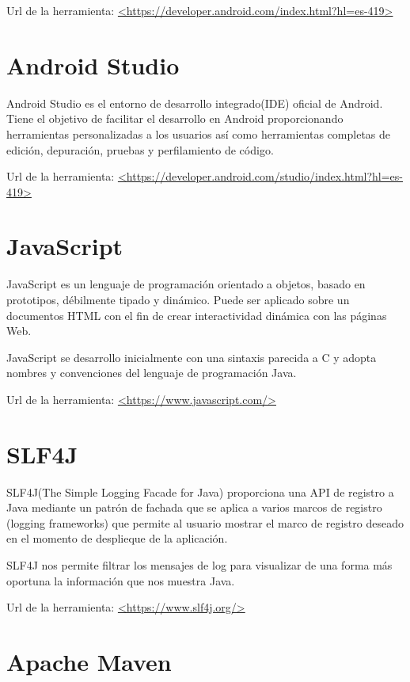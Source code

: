 Url de la herramienta: \url{<https://developer.android.com/index.html?hl=es-419>}

\section{Android Studio}

Android Studio es el entorno de desarrollo integrado(IDE) oficial de Android. Tiene el objetivo de facilitar el desarrollo en Android proporcionando herramientas personalizadas a los usuarios así como herramientas completas de edición, depuración, pruebas y perfilamiento de código.

Url de la herramienta: \url{<https://developer.android.com/studio/index.html?hl=es-419>}

\section{JavaScript}

JavaScript es un lenguaje de programación orientado a objetos, basado en prototipos, débilmente tipado y dinámico. Puede ser aplicado sobre un documentos HTML con el fin de crear interactividad dinámica con las páginas Web.

JavaScript se desarrollo inicialmente con una sintaxis parecida a C y adopta nombres y convenciones del lenguaje de programación Java.\cite{wiki:javascript}

Url de la herramienta: \url{<https://www.javascript.com/>}

\section{SLF4J}

SLF4J(The Simple Logging Facade for Java) proporciona una API de registro a Java mediante un patrón de fachada que se aplica a varios marcos de registro (logging frameworks) que permite al usuario mostrar el marco de registro deseado en el momento de desplieque de la aplicación.

SLF4J nos permite filtrar los mensajes de log para visualizar de una forma más oportuna la información que nos muestra Java.

Url de la herramienta: \url{<https://www.slf4j.org/>}

\section{Apache Maven}

